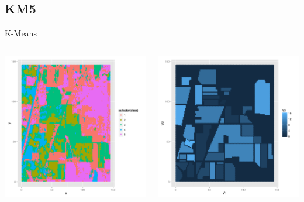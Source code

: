 \documentclass[11pt]{beamer}
\begin{document}
\subsection{KM5}
\begin{frame}{K-Means}
\begin{columns}[T]
\begin{column}{.48\textwidth}
\includegraphics[scale=.3]{km5.png}
\end{column}
\hfill
\begin{column}{.48\textwidth}
\includegraphics[scale=.3]{gt.png}
\end{column}
\end{columns}
\end{frame}
\end{document}
